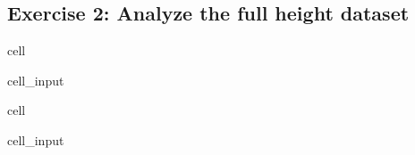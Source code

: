 \documentclass[letterpaper,10pt,english]{jupyterBook}
\begin{document}
\subsection{Exercise 2: Analyze the full height dataset}
\label{\detokenize{exercises_unit_2:exercise-2-analyze-the-full-height-dataset}}
\begin{sphinxuseclass}{cell}\begin{sphinxVerbatimInput}

\begin{sphinxuseclass}{cell_input}
\begin{sphinxVerbatim}[commandchars=\\\{\}]
\end{sphinxVerbatim}

\end{sphinxuseclass}\end{sphinxVerbatimInput}

\end{sphinxuseclass}
\begin{sphinxuseclass}{cell}\begin{sphinxVerbatimInput}

\begin{sphinxuseclass}{cell_input}
\begin{sphinxVerbatim}[commandchars=\\\{\}]
\end{sphinxVerbatim}

\end{sphinxuseclass}\end{sphinxVerbatimInput}

\end{sphinxuseclass}
\end{document}
